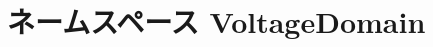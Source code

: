 \hypertarget{namespaceVoltageDomain}{
\section{ネームスペース VoltageDomain}
\label{namespaceVoltageDomain}
}
